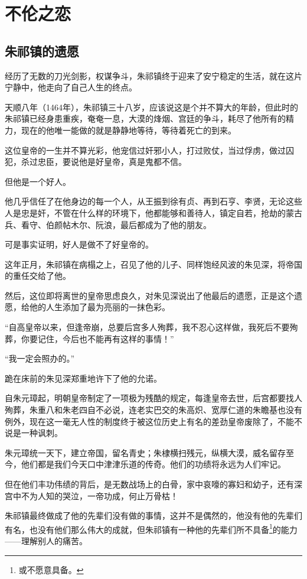 \section{不伦之恋}
\ifnum{}
	\begin{multicols}{\theparacolNo}
\fi
\subsection{朱祁镇的遗愿}
经历了无数的刀光剑影，权谋争斗，朱祁镇终于迎来了安宁稳定的生活，就在这片宁静中，他走向了自己人生的终点。

天顺八年（1464年），朱祁镇三十八岁，应该说这是个并不算大的年龄，但此时的朱祁镇已经身患重疾，奄奄一息，大漠的烽烟、宫廷的争斗，耗尽了他所有的精力，现在的他唯一能做的就是静静地等待，等待着死亡的到来。

这位皇帝的一生并不算光彩，他宠信过奸邪小人，打过败仗，当过俘虏，做过囚犯，杀过忠臣，要说他是好皇帝，真是鬼都不信。

但他是一个好人。

他几乎信任了在他身边的每一个人，从王振到徐有贞、再到石亨、李贤，无论这些人是忠是奸，不管在什么样的环境下，他都能够和善待人，镇定自若，抢劫的蒙古兵、看守、伯颜帖木尔、阮浪，最后都成为了他的朋友。

可是事实证明，好人是做不了好皇帝的。

这年正月，朱祁镇在病榻之上，召见了他的儿子、同样饱经风波的朱见深，将帝国的重任交给了他。

然后，这位即将离世的皇帝思虑良久，对朱见深说出了他最后的遗愿，正是这个遗愿，给他的人生添加了最为亮丽的一抹色彩。

“自高皇帝以来，但逢帝崩，总要后宫多人殉葬，我不忍心这样做，我死后不要殉葬，你要记住，今后也不能再有这样的事情！”

“我一定会照办的。”

跪在床前的朱见深郑重地许下了他的允诺。

自朱元璋起，明朝皇帝制定了一项极为残酷的规定，每逢皇帝去世，后宫都要找人殉葬，朱重八和朱老四自不必说，连老实巴交的朱高炽、宽厚仁道的朱瞻基也没有例外，现在这一毫无人性的制度终于被这位历史上有名的差劲皇帝废除了，不能不说是一种讽刺。

朱元璋统一天下，建立帝国，留名青史；朱棣横扫残元，纵横大漠，威名留存至今，他们都是我们今天口中津津乐道的传奇。他们的功绩将永远为人们牢记。

但在他们丰功伟绩的背后，是无数战场上的白骨，家中哀嚎的寡妇和幼子，还有深宫中不为人知的哭泣，一帝功成，何止万骨枯！

朱祁镇最终做成了他的先辈们没有做的事情，这并不是偶然的，他没有他的先辈们有名，也没有他们那么伟大的成就，但朱祁镇有一种他的先辈们所不具备\footnote{或不愿意具备。}的能力——理解别人的痛苦。


\end{multicols}
